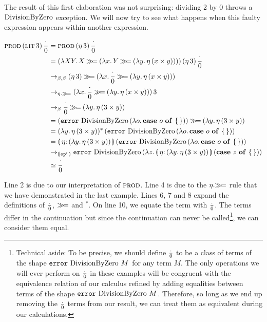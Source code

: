 The result of this first elaboration was not surprising: dividing 2 by 0
throws a $\operatorname{DivisionByZero}$ exception. We will now try to see what happens when
this faulty expression appears within another expression.

\NoChapterPrefix
\begin{align}
  \app{\prode}{\litec{3}}{\dbze}
  &= \app{\prode}{(\ap{\eta}{3})}{\dbze} \\
  &= \app{(\lam{X Y}{X \hsbind (\lam{x}{Y \hsbind (\lam{y}{\ap{\eta}
          {(x \times y)}})})})}
      {(\ap{\eta}{3})}{\dbze} \\
  &\to_{\beta,\beta} (\ap{\eta}{3}) \hsbind (\lam{x}{\dbze \hsbind (\lam{y}{\ap{\eta}
          {(x \times y)}})}) \\
  &\to_{\eta.\hsbind} \ap{(\lam{x}{\dbze \hsbind (\lam{y}{\ap{\eta}
          {(x \times y)}})})}{3} \\
  &\to_{\beta} \dbze \hsbind (\lam{y}{\ap{\eta} {(3 \times y)}}) \\
  &= (\app{\op{error}}{\dbzelong}{(\lam{o}{\absurd{o}})}) \hsbind (\lam{y}{\ap{\eta} {(3 \times y)}}) \\
  &= \ap{(\lam{y}{\ap{\eta} {(3 \times y)}})^*}{(\app{\op{error}}{\dbzelong}{(\lam{o}{\absurd{o}})})} \\
  &= \ap{\banana{\onto{\eta}{(\lam{y}{\ap{\eta} {(3 \times y)}})}}}{(\app{\op{error}}{\dbzelong}{(\lam{o}{\absurd{o}})})} \\
  &\to_{\banana{\op{op}'}} \app{\op{error}}{\dbzelong}{(\lam{z}{\ap{\banana{\onto{\eta}{(\lam{y}{\ap{\eta} {(3 \times y)}})}}}{(\absurd{z})}})} \\
  &\simeq \dbze
\end{align}
\setcounter{equation}{0}
\ChapterPrefix

Line 2 is due to our interpretation of $\textsc{prod}$. Line 4 is due to the
$\eta.\mathbin{\gg\!=}$ rule that we have demonstrated in the last example. Lines 6,
7 and 8 expand the definitions of $\frac{\cdot}{0}$, $\mathbin{\gg\!=}$ and $^*$. On line 10,
we equate the term with $\frac{\cdot}{0}$. The terms differ in the continuation but
since the continuation can never be called\footnote{Technical aside: To be
  precise, we should define $\frac{\cdot}{0}$ to be a class of terms of the shape
  $\mathtt{error}\,\operatorname{DivisionByZero}\,M$ for any term $M$. The only operations we
  will ever perform on $\frac{\cdot}{0}$ in these examples will be congruent with the
  equivalence relation of our calculus refined by adding equalities between
  terms of the shape $\mathtt{error}\,\operatorname{DivisionByZero}\,M$. Therefore, so long
  as we end up removing the $\frac{\cdot}{0}$ terms from our result, we can treat
  them as equivalent during our calculations.}, we can consider them equal.

